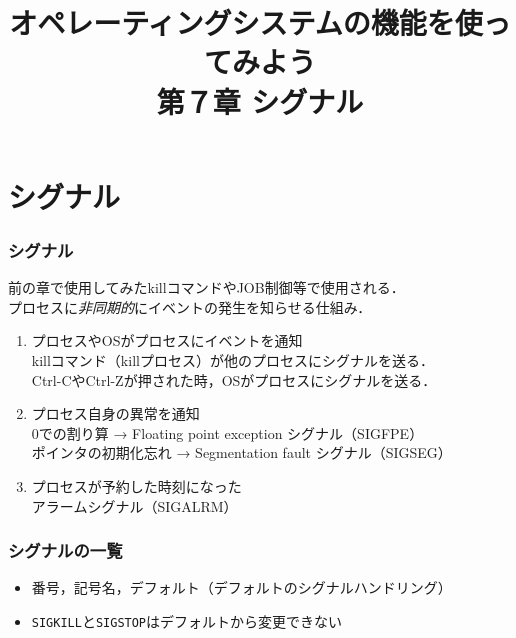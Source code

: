 \documentclass{beamer}                 %
\begin{document}
\title{オペレーティングシステムの機能を使ってみよう\\
第７章 シグナル}
\date{}

\begin{frame}
  \titlepage
\end{frame}


\section{シグナル}
\begin{frame}[fragile]
  \frametitle{シグナル}
  前の章で使用してみたkillコマンドやJOB制御等で使用される．\\
  プロセスに\emph{非同期的}にイベントの発生を知らせる仕組み．

  \begin{enumerate}
    \item[1)] プロセスやOSがプロセスにイベントを通知 \\
      killコマンド（killプロセス）が他のプロセスにシグナルを送る．\\
      Ctrl-CやCtrl-Zが押された時，OSがプロセスにシグナルを送る．
    \item[2)] プロセス自身の異常を通知 \\
      0での割り算 → Floating point exception シグナル（SIGFPE） \\
      ポインタの初期化忘れ → Segmentation fault シグナル（SIGSEG）
    \item[3)] プロセスが予約した時刻になった \\
      アラームシグナル（SIGALRM）
  \end{enumerate}
\end{frame}

\begin{frame}[fragile]
  \frametitle{シグナルの一覧}

  \begin{itemize}
  \item 番号，記号名，デフォルト（デフォルトのシグナルハンドリング）
  \item \texttt{SIGKILL}と\texttt{SIGSTOP}はデフォルトから変更できない
  \end{itemize}
\end{frame}
\end{document}
